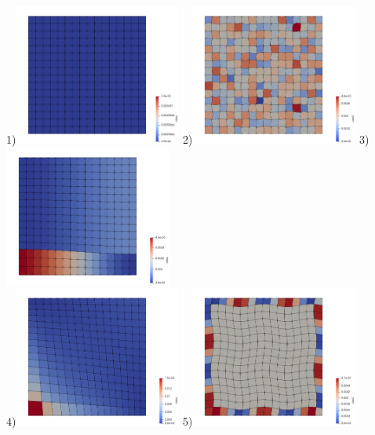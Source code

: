 \begin{center}
{\small 1})\includegraphics[width=5.5cm]{python_codes/fieldstone_76/results/mt1}
{\small 2})\includegraphics[width=5.5cm]{python_codes/fieldstone_76/results/mt2}
{\small 3})\includegraphics[width=5.5cm]{python_codes/fieldstone_76/results/mt3}\\
{\small 4})\includegraphics[width=5.5cm]{python_codes/fieldstone_76/results/mt4}
{\small 5})\includegraphics[width=5.5cm]{python_codes/fieldstone_76/results/mt5}

\end{center}
